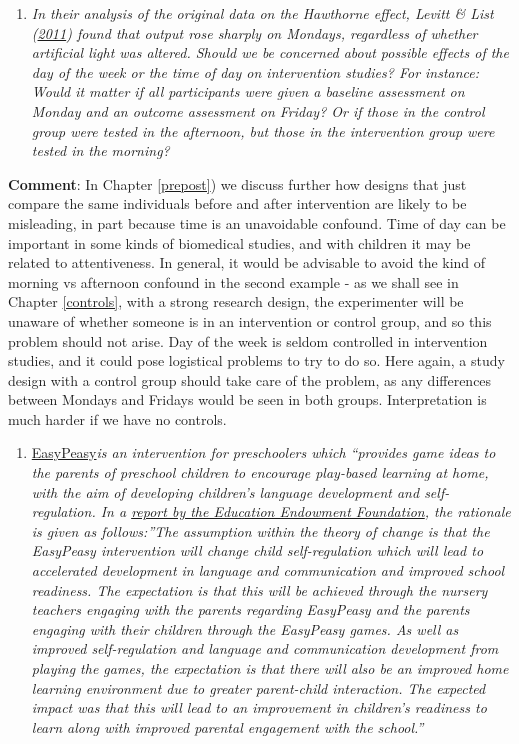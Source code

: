 \documentclass{krantz}
\providecommand{\tightlist}{%
\setlength{\itemsep}{0pt}\setlength{\parskip}{0pt}}
\begin{document}
\begin{enumerate}
\def\labelenumi{\arabic{enumi}.}
\tightlist
\item
  \emph{In their analysis of the original data on the Hawthorne effect, Levitt \& List (\protect\hyperlink{ref-levitt2011}{2011}) found that output rose sharply on Mondays, regardless of whether artificial light was altered. Should we be concerned about possible effects of the day of the week or the time of day on intervention studies? For instance: Would it matter if all participants were given a baseline assessment on Monday and an outcome assessment on Friday? Or if those in the control group were tested in the afternoon, but those in the intervention group were tested in the morning?}
\end{enumerate}

\textbf{Comment}: In Chapter \ref{prepost}) we discuss further how designs that just compare the same individuals before and after intervention are likely to be misleading, in part because time is an unavoidable confound. Time of day can be important in some kinds of biomedical studies, and with children it may be related to attentiveness. In general, it would be advisable to avoid the kind of morning vs afternoon confound in the second example - as we shall see in Chapter \ref{controls}, with a strong research design, the experimenter will be unaware of whether someone is in an intervention or control group, and so this problem should not arise. Day of the week is seldom controlled in intervention studies, and it could pose logistical problems to try to do so. Here again, a study design with a control group should take care of the problem, as any differences between Mondays and Fridays would be seen in both groups. Interpretation is much harder if we have no controls.

\begin{enumerate}
\def\labelenumi{\arabic{enumi}.}
\setcounter{enumi}{1}
\tightlist
\item
  \href{https://guidebook.eif.org.uk/programme/easypeasy}{EasyPeasy}\emph{is an intervention for preschoolers which ``provides game ideas to the parents of preschool children to encourage play-based learning at home, with the aim of developing children's language development and self-regulation. In a \href{https://d2tic4wvo1iusb.cloudfront.net/documents/projects/EasyPeasy.pdf?v=1686132397}{report by the Education Endowment Foundation}, the rationale is given as follows:''The assumption within the theory of change is that the EasyPeasy intervention will change child self-regulation which will lead to accelerated development in language and communication and improved school readiness. The expectation is that this will be achieved through the nursery teachers engaging with the parents regarding EasyPeasy and the parents engaging with their children through the EasyPeasy games. As well as improved self-regulation and language and communication development from playing the games, the expectation is that there will also be an improved home learning environment due to greater parent-child interaction. The expected impact was that this will lead to an improvement in children's readiness to learn along with improved parental engagement with the school.''}
\end{enumerate}
\end{document}

